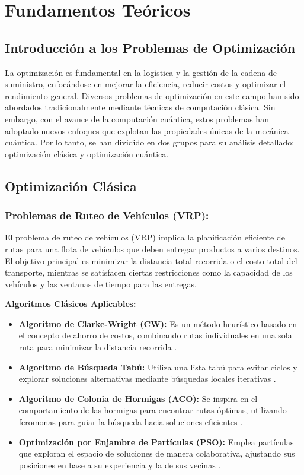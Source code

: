 \documentclass[11pt,a4paper,spanish]{book}
\begin{document}
\chapter{Fundamentos Teóricos}

\section{Introducción a los Problemas de Optimización}

La optimización es fundamental en la logística y la gestión de la cadena de suministro, enfocándose en mejorar la eficiencia, reducir costos y optimizar el rendimiento general. Diversos problemas de optimización en este campo han sido abordados tradicionalmente mediante técnicas de computación clásica. Sin embargo, con el avance de la computación cuántica, estos problemas han adoptado nuevos enfoques que explotan las propiedades únicas de la mecánica cuántica. Por lo tanto, se han dividido en dos grupos para su análisis detallado: optimización clásica y optimización cuántica.

\section{Optimización Clásica}

\subsection{Problemas de Ruteo de Vehículos (VRP):} 
	
	El problema de ruteo de vehículos (VRP) implica la planificación eficiente de rutas para una flota de vehículos que deben entregar productos a varios destinos. El objetivo principal es minimizar la distancia total recorrida o el costo total del transporte, mientras se satisfacen ciertas restricciones como la capacidad de los vehículos y las ventanas de tiempo para las entregas.
	
	\textbf{Algoritmos Clásicos Aplicables:}
	\begin{itemize}
		\item \textbf{Algoritmo de Clarke-Wright (CW):} Es un método heurístico basado en el concepto de ahorro de costos, combinando rutas individuales en una sola ruta para minimizar la distancia recorrida \cite{clarkeWright}.
		\item \textbf{Algoritmo de Búsqueda Tabú:} Utiliza una lista tabú para evitar ciclos y explorar soluciones alternativas mediante búsquedas locales iterativas \cite{glover1989tabu}.
		\item \textbf{Algoritmo de Colonia de Hormigas (ACO):} Se inspira en el comportamiento de las hormigas para encontrar rutas óptimas, utilizando feromonas para guiar la búsqueda hacia soluciones eficientes \cite{dorigo1997ant}.
		\item \textbf{Optimización por Enjambre de Partículas (PSO):} Emplea partículas que exploran el espacio de soluciones de manera colaborativa, ajustando sus posiciones en base a su experiencia y la de sus vecinas \cite{kennedy1995particle}.
	\end{itemize}
	
\end{document}
